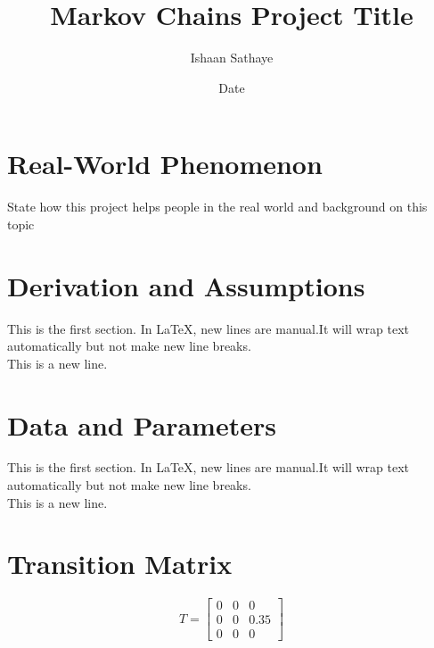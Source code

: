 \documentclass{article}
\title{Markov Chains Project Title}
\author{Ishaan Sathaye }
\date{Date}
\begin{document}
\maketitle

\section{Real-World Phenomenon}
State how this project helps people in the real world and background on this topic

\section{Derivation and Assumptions}
This is the first section. In LaTeX, new lines are manual.It will wrap text automatically but not make new line breaks.\\ 
This is a new line.

\section{Data and Parameters}
This is the first section. In LaTeX, new lines are manual.It will wrap text automatically but not make new line breaks.\\ 
This is a new line.

\section{Transition Matrix}

$$
T = 
\begin{bmatrix}
0 & 0 & 0 \\ %
0 & 0 & 0.35 \\ %
0 & 0 & 0    %
\end{bmatrix}
$$
\end{document}

